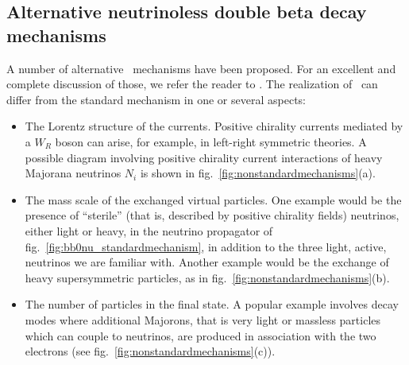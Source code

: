 \subsection{Alternative neutrinoless double beta decay mechanisms} \label{subsec:bb0nu_alternativemechanisms}
A number of alternative \bbonu\ mechanisms have been proposed. For an excellent and complete discussion of those, we refer the reader to \cite{Rodejohann:2011mu}. The realization of \bbonu\ can differ from the standard mechanism in one or several aspects:
%
\begin{itemize}
\item The Lorentz structure of the currents. Positive chirality currents mediated by a $W_R$ boson can arise, for example, in left-right symmetric theories. A possible diagram involving positive chirality current interactions of heavy Majorana neutrinos $N_i$ is shown in fig.~\ref{fig:nonstandardmechanisms}(a).
%
\item The mass scale of the exchanged virtual particles. One example would be the presence of ``sterile'' (that is, described by positive chirality fields) neutrinos, either light or heavy, in the neutrino propagator of fig.~\ref{fig:bb0nu_standardmechanism}, in addition to the three light, active, neutrinos we are familiar with. Another example would be the exchange of heavy supersymmetric particles, as in fig.~\ref{fig:nonstandardmechanisms}(b).
%
\item The number of particles in the final state. A popular example involves decay modes where additional Majorons, that is very light or massless particles which can couple to neutrinos, are produced in association with the two electrons (see fig.~\ref{fig:nonstandardmechanisms}(c)).
\end{itemize}
%
